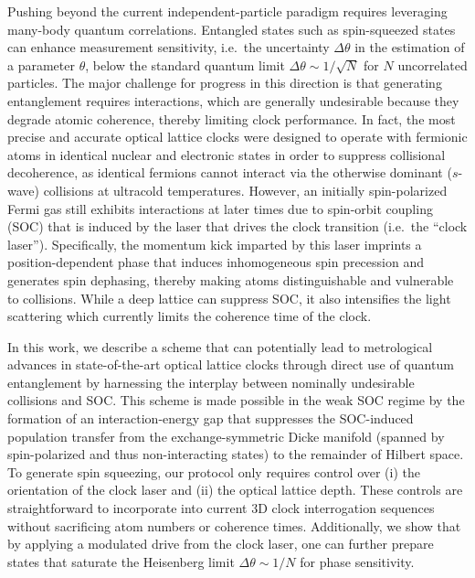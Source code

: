 \documentclass[aps,prx,superscriptaddress,notitlepage,twocolumn,longbibliography]{revtex4-1}
\begin{document}
Pushing beyond the current independent-particle paradigm requires leveraging many-body quantum correlations.
Entangled states such as spin-squeezed states\cite{kitagawa1993squeezed, wineland1992spin, ma2011quantum} can enhance measurement sensitivity, i.e.~the uncertainty $\Delta\theta$ in the estimation of a parameter $\theta$, below the standard quantum limit $\Delta\theta\sim1/\sqrt{N}$ for $N$ uncorrelated particles\cite{itano1993quantum, degen2017quantum}.
The major challenge for progress in this direction is that generating entanglement requires interactions, which are generally undesirable because they degrade atomic coherence, thereby limiting clock performance\cite{swallows2011suppression, martin2013quantum, rey2014probing, ludlow2011coldcollisionshift, lemke2011wave, ludlow2015optical}.
In fact, the most precise and accurate optical lattice clocks were designed to operate with fermionic atoms in identical nuclear and electronic states in order to suppress collisional decoherence\cite{campbell2009probing, swallows2011suppression, campbell2017fermidegenerate}, as identical fermions cannot interact via the otherwise dominant ($s$-wave) collisions at ultracold temperatures.
However, an initially spin-polarized Fermi gas still exhibits interactions at later times due to spin-orbit coupling (SOC) that is induced by the laser that drives the clock transition (i.e.~the ``clock laser'')\cite{wall2016synthetic, kolkowitz2016spinorbitcoupled, livi2016synthetic, bromley2018dynamics}.
Specifically, the momentum kick imparted by this laser imprints a position-dependent phase that induces inhomogeneous spin precession and generates spin dephasing, thereby making atoms distinguishable and vulnerable to collisions.
While a deep lattice can suppress SOC, it also intensifies the light scattering which currently limits the coherence time of the clock\cite{dorscher2018latticeinduced, goban2018emergence, hutson2019engineering}.

In this work, we describe a scheme that can potentially lead to metrological advances in state-of-the-art optical lattice clocks through direct use of quantum entanglement by harnessing the interplay between nominally undesirable collisions and SOC.
This scheme is made possible in the weak SOC regime by the formation of an interaction-energy gap that suppresses the SOC-induced population transfer from the exchange-symmetric Dicke manifold (spanned by spin-polarized and thus non-interacting states) to the remainder of Hilbert space. To generate spin squeezing, our protocol only requires control over (i) the orientation of the clock laser and (ii) the optical lattice depth.
These controls are straightforward to incorporate into current 3D clock interrogation sequences without sacrificing atom numbers or coherence times.
Additionally, we show that by applying a modulated drive from the clock laser, one can further prepare states that saturate the Heisenberg limit $\Delta\theta \sim 1/N$ for phase sensitivity\cite{kitagawa1993squeezed, ma2011quantum, degen2017quantum}.
\end{document}
